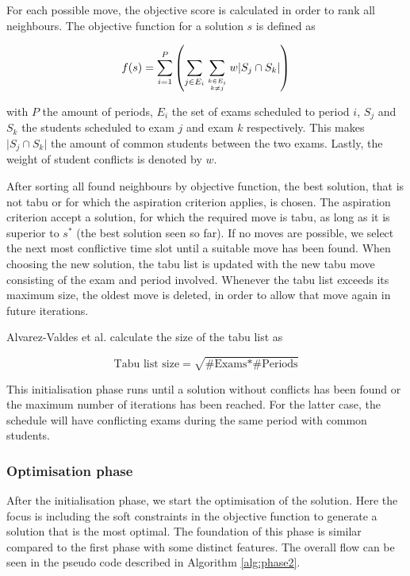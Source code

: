 For each possible move, the objective score is calculated in order to rank all neighbours. The objective function for a solution $s$ is defined as

\begin{equation}
    f(s) = \sum_{i=1}^{P} \left( \sum_{j \in E_i}^{}\sum_{k \in E_i \atop k \neq j}^{}w \lvert S_j \cap S_k \rvert \right)
\end{equation}


with $P$ the amount of periods, $E_i$ the set of exams scheduled to period $i$, $S_j$ and $S_k$ the students scheduled to exam $j$ and exam $k$ respectively. This makes $\lvert S_j \cap S_k \rvert$ the amount of common students between the two exams. Lastly, the weight of student conflicts is denoted by $w$.

After sorting all found neighbours by objective function, the best solution, that is not tabu or for which the aspiration criterion applies, is chosen. The aspiration criterion accept a solution, for which the required move is tabu, as long as it is superior to $s^*$ (the best solution seen so far). If no moves are possible, we select the next most conflictive time slot until a suitable move has been found. When choosing the new solution, the tabu list is updated with the new tabu move consisting of the exam and period involved. Whenever the tabu list exceeds its maximum size, the oldest move is deleted, in order to allow that move again in future iterations.

Alvarez-Valdes et al. calculate the size of the tabu list as

\begin{equation} \label{eq:list}
    \text{Tabu list size} = \sqrt{\text{\# Exams} * \text{\# Periods}}
\end{equation}

This initialisation phase runs until a solution without conflicts has been found or the maximum number of iterations has been reached. For the latter case, the schedule will have conflicting exams during the same period with common students.

\subsubsection{Optimisation phase}

After the initialisation phase, we start the optimisation of the solution. Here the focus is including the soft constraints in the objective function to generate a solution that is the most optimal. The foundation of this phase is similar compared to the first phase with some distinct features. The overall flow can be seen in the pseudo code described in Algorithm \ref{alg:phase2}.

